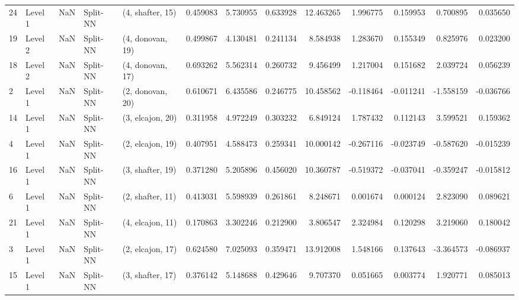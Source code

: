 \begin{tabular}{llrllrrrrrrrr}
24 &   Level 1 &    NaN &       Split-NN &  (4, shafter, 15) &   0.459083 &   5.730955 &  0.633928 &  12.463265 &             1.996775 &               0.159953 &            0.700895 &              0.035650 \\
19 &   Level 2 &    NaN &       Split-NN &  (4, donovan, 19) &   0.499867 &   4.130481 &  0.241134 &   8.584938 &             1.283670 &               0.155349 &            0.825976 &              0.023200 \\
18 &   Level 2 &    NaN &       Split-NN &  (4, donovan, 17) &   0.693262 &   5.562314 &  0.260732 &   9.456499 &             1.217004 &               0.151682 &            2.039724 &              0.056239 \\
2  &   Level 1 &    NaN &       Split-NN &  (2, donovan, 20) &   0.610671 &   6.435586 &  0.246775 &  10.458562 &            -0.118464 &              -0.011241 &           -1.558159 &             -0.036766 \\
14 &   Level 1 &    NaN &       Split-NN &  (3, elcajon, 20) &   0.311958 &   4.972249 &  0.303232 &   6.849124 &             1.787432 &               0.112143 &            3.599521 &              0.159362 \\
4  &   Level 1 &    NaN &       Split-NN &  (2, elcajon, 19) &   0.407951 &   4.588473 &  0.259341 &  10.000142 &            -0.267116 &              -0.023749 &           -0.587620 &             -0.015239 \\
16 &   Level 1 &    NaN &       Split-NN &  (3, shafter, 19) &   0.371280 &   5.205896 &  0.456020 &  10.360787 &            -0.519372 &              -0.037041 &           -0.359247 &             -0.015812 \\
6  &   Level 1 &    NaN &       Split-NN &  (2, shafter, 11) &   0.413031 &   5.598939 &  0.261861 &   8.248671 &             0.001674 &               0.000124 &            2.823090 &              0.089621 \\
21 &   Level 1 &    NaN &       Split-NN &  (4, elcajon, 11) &   0.170863 &   3.302246 &  0.212900 &   3.806547 &             2.324984 &               0.120298 &            3.219060 &              0.180042 \\
3  &   Level 1 &    NaN &       Split-NN &  (2, elcajon, 17) &   0.624580 &   7.025093 &  0.359471 &  13.912008 &             1.548166 &               0.137643 &           -3.364573 &             -0.086937 \\
15 &   Level 1 &    NaN &       Split-NN &  (3, shafter, 17) &   0.376142 &   5.148688 &  0.429646 &   9.707370 &             0.051665 &               0.003774 &            1.920771 &              0.085013 \\

\end{tabular}
